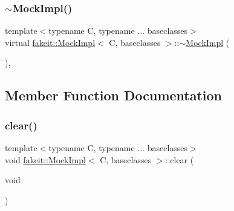 \subsubsection{\texorpdfstring{$\sim$MockImpl()}{~MockImpl()}\hspace{0.1cm}{\footnotesize\ttfamily [9/9]}}
{\footnotesize\ttfamily template$<$typename C, typename ... baseclasses$>$ \\
virtual \mbox{\hyperlink{classfakeit_1_1MockImpl}{fakeit\+::\+Mock\+Impl}}$<$ C, baseclasses $>$\+::$\sim$\mbox{\hyperlink{classfakeit_1_1MockImpl}{Mock\+Impl}} (\begin{DoxyParamCaption}{ }\end{DoxyParamCaption})\hspace{0.3cm}{\ttfamily [inline]}, {\ttfamily [virtual]}}



\subsection{Member Function Documentation}
\mbox{\label{classfakeit_1_1MockImpl_a3985505d2ec7bd50a5d71f155c5ae458}} 
\subsubsection{\texorpdfstring{clear()}{clear()}\hspace{0.1cm}{\footnotesize\ttfamily [1/9]}}
{\footnotesize\ttfamily template$<$typename C, typename ... baseclasses$>$ \\
void \mbox{\hyperlink{classfakeit_1_1MockImpl}{fakeit\+::\+Mock\+Impl}}$<$ C, baseclasses $>$\+::clear (\begin{DoxyParamCaption}\item[{void}]{ }\end{DoxyParamCaption})\hspace{0.3cm}{\ttfamily [inline]}}

\mbox{\label{classfakeit_1_1MockImpl_a3985505d2ec7bd50a5d71f155c5ae458}} 

